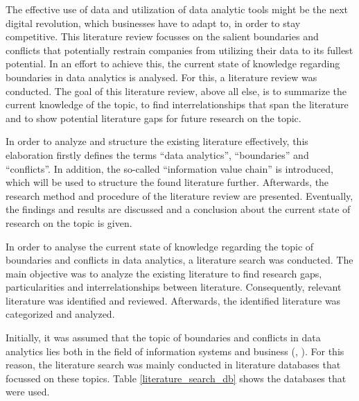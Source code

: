 The effective use of data and utilization of data analytic tools might be the next digital revolution, which businesses have to adapt to, in order to stay competitive. This literature review focusses on the salient boundaries and conflicts that potentially restrain companies from utilizing their data to its fullest potential. In an effort to achieve this, the current state of knowledge regarding boundaries in data analytics is analysed. For this, a literature review was conducted. The goal of this literature review, above all else, is to summarize the current knowledge of the topic, to find interrelationships that span the literature and to show potential literature gaps for future research on the topic.

In order to analyze and structure the existing literature effectively, this elaboration firstly defines the terms \enquote{data analytics}, \enquote{boundaries} and \enquote{conflicts}. In addition, the so-called \enquote{information value chain} is introduced, which will be used to structure the found literature further. Afterwards, the research method and procedure of the literature review are presented. Eventually, the findings and results are discussed and a conclusion about the current state of research on the topic is given.


In order to analyse the current state of knowledge regarding the topic of boundaries and conflicts in data analytics, a literature search was conducted. The main objective was to analyze the existing literature to find research gaps, particularities and interrelationships between literature. Consequently, relevant literature was identified and reviewed. Afterwards, the identified literature was categorized and analyzed. 

Initially, it was assumed that the topic of boundaries and conflicts in data analytics lies both in the field of information systems and business (\cite{Abbasi.2016}, \cite{Levina.2005}). For this reason, the literature search was mainly conducted in literature databases that focussed on these topics. Table \ref{literature_search_db} shows the databases that were used. 


